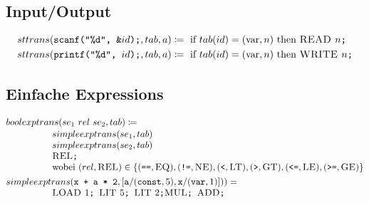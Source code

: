 \documentclass[ngerman,a4paper, 12pt, fleqn]{article}
\newcommand{\defeq}{\coloneqq}
\newcommand{\befehl}[1]{\textsc{#1}}
\begin{document}
	\subsection*{Input/Output}
	\begin{align*}
		&sttrans(\texttt{scanf("\%d", \&}id\texttt{);}, tab, a) \defeq \text{ if } tab(id) = (\operatorname{var}, n) \text{ then } \befehl{READ } n\texttt{;} \\
		&sttrans(\texttt{printf("\%d", } id\texttt{);}, tab, a) \defeq \text{ if } tab(id) = (\operatorname{var}, n) \text{ then } \befehl{WRITE } n\texttt{;}
	\end{align*}

 	\subsection*{Einfache Expressions}
	
	\begin{align*}
		&boolexptrans(se_1 \ rel \ se_2, tab) \defeq \\[-3pt]
		&\hspace{5em}\begin{aligned}
			&simpleexptrans(se_1 , tab) \\[-3pt]
			&simpleexptrans(se_2 , tab) \\[-3pt]
			&\befehl{REL}\texttt{;} \\[-3pt]
			&\text{wobei } (rel , \befehl{REL}) \in \{ (\texttt{==}, \befehl{EQ}), (\texttt{!=}, \befehl{NE}), (\texttt{<}, \befehl{LT}), (\texttt{>}, \befehl{GT}), (\texttt{<=}, \befehl{LE}), (\texttt{>=}, \befehl{GE}) \} 
		\end{aligned} \\	
		&simpleexptrans(\texttt{x + a * 2}, [\texttt{a}/(\texttt{const}, 5), \texttt{x}/(\texttt{var}, 1)])) = \\[-3pt]
		& \hspace{5em}
		\befehl{LOAD } 1\texttt{; } \befehl{LIT } 5 \texttt{; } \befehl{LIT } 2 \texttt{;} \befehl{MUL} \texttt{; } \befehl{ADD} \texttt{;}	
	\end{align*}
\end{document}
